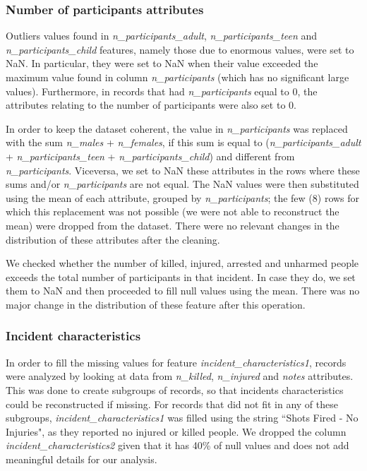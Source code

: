 \documentclass[10pt,a4paper]{report}
\begin{document}
\subsubsection{Number of participants attributes}

Outliers values found in \textit{n\_participants\_adult}, \textit{n\_participants\_teen} and \textit{n\_participants\_child} features, namely those due to enormous values, were set to NaN.
In particular, they were set to NaN when their value exceeded the maximum value found in column \textit{n\_participants} (which has no significant large values).
Furthermore, in records that had \textit{n\_participants} equal to 0, the attributes relating to the number of participants were also set to 0.

In order to keep the dataset coherent, the value in \textit{n\_participants} was replaced with the sum \textit{n\_males} + \textit{n\_females}, if this sum is equal to (\textit{n\_participants\_adult} + \textit{n\_participants\_teen} + \textit{n\_participants\_child}) and different from \textit{n\_participants}.
Viceversa, we set to NaN these attributes in the rows where these sums and/or \textit{n\_participants} are not equal.
The NaN values were then substituted using the mean of each attribute, grouped by \textit{n\_participants}; the few (8) rows for which this replacement was not possible (we were not able to reconstruct the mean) were dropped from the dataset.
There were no relevant changes in the distribution of these attributes after the cleaning.

We checked whether the number of killed, injured, arrested and unharmed people exceeds the total number of participants in that incident.
In case they do, we set them to NaN and then proceeded to fill null values using the mean.
There was no major change in the distribution of these feature after this operation.

\subsubsection{Incident characteristics}

In order to fill the missing values for feature \textit{incident\_characteristics1}, records were analyzed by looking at data from \textit{n\_killed}, \textit{n\_injured} and \textit{notes} attributes.
This was done to create subgroups of records, so that incidents characteristics could be reconstructed if missing.
For records that did not fit in any of these subgroups, \textit{incident\_characteristics1} was filled using the string ``Shots Fired - No Injuries", as they reported no injured or killed people.
We dropped the column \textit{incident\_characteristics2} given that it has 40\% of null values and does not add meaningful details for our analysis.
\end{document}
